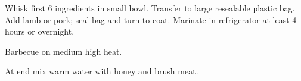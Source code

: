 
Whisk first 6 ingredients in small bowl. Transfer to large resealable plastic bag. 
Add lamb or pork; seal bag and turn to coat. 
Marinate in refrigerator at least 4 hours or overnight.

Barbecue on medium high heat.

At end mix warm water with honey and brush meat.
